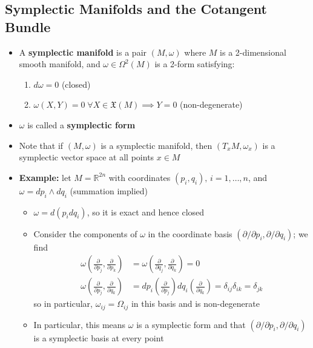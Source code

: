 \documentclass[12pt,a4paper]{article}
\numberwithin{equation}{section}
\begin{document}
	\subsection{Symplectic Manifolds and the Cotangent Bundle}
	\begin{itemize}
		\item A \textbf{symplectic manifold} is a pair $(M,\omega)$ where $M$ is a 2-dimensional smooth manifold, and $\omega\in\Omega^{2}(M)$ is a 2-form satisfying:
		\begin{enumerate}
			\item $d\omega=0$ (closed)
			\item $\omega(X,Y)=0\;\forall X\in\mathfrak{X}(M)\implies Y=0$ (non-degenerate)
		\end{enumerate}
		\item $\omega$ is called a \textbf{symplectic form}
		\item Note that if $(M,\omega)$ is a symplectic manifold, then $(T_{x}M,\omega_{x})$ is a symplectic vector space at all points $x\in M$
		\item \textbf{Example:} let $M=\mathbb{R}^{2n}$ with coordinates $(p_{i},q_{i}),\,i=1,\ldots,n$, and $\omega=dp_{i}\wedge dq_{i}$ (summation implied)
		\begin{itemize}
			\item $\omega=d(p_{i}dq_{i})$, so it is exact and hence closed
			\item Consider the components of $\omega$ in the coordinate basis $(\partial/\partial p_{i},\partial/\partial q_{i})$; we find
			\begin{equation}
				\begin{aligned}
					\omega\left(\frac{\partial}{\partial p_{j}},\frac{\partial}{\partial p_{k}}\right)&=\omega\left(\frac{\partial}{\partial q_{j}},\frac{\partial}{\partial q_{k}}\right)=0\\
					\omega\left(\frac{\partial}{\partial p_{j}},\frac{\partial}{\partial q_{k}}\right)&=dp_{i}\left(\frac{\partial}{\partial p_{j}}\right)dq_{i}\left(\frac{\partial}{\partial q_{k}}\right)=\delta_{ij}\delta_{ik}=\delta_{jk}
				\end{aligned}
			\end{equation}
			so in particular, $\omega_{ij}=\Omega_{ij}$ in this basis and is non-degenerate
			\item In particular, this means $\omega$ is a symplectic form and that $(\partial/\partial p_{i},\partial/\partial q_{i})$ is a symplectic basis at every point
		\end{itemize}

\end{itemize}
\end{document}
